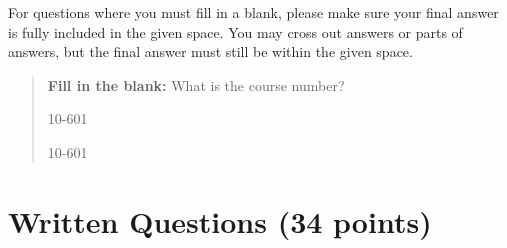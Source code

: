 \documentclass[11pt,addpoints,answers]{exam}
\begin{document}
For questions where you must fill in a blank, please make sure your final answer is fully included in the given space. You may cross out answers or parts of answers, but the final answer must still be within the given space.

\begin{quote}
\textbf{Fill in the blank:} What is the course number?

\begin{tcolorbox}[fit,height=1cm, width=4cm, blank, borderline={1pt}{-2pt},nobeforeafter]
    \begin{center}\huge10-601\end{center}
    \end{tcolorbox}\hspace{2cm}
    \begin{tcolorbox}[fit,height=1cm, width=4cm, blank, borderline={1pt}{-2pt},nobeforeafter]
    \begin{center}\huge10-601\end{center}
    \end{tcolorbox}
\end{quote}

\clearpage
\clearpage
\section{Written Questions (34 points)}
\end{document}

